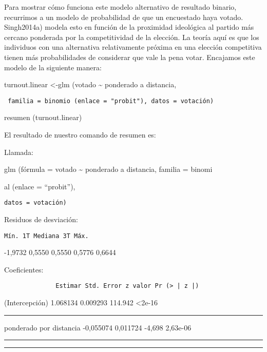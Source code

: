 \documentclass[
]{book}
\begin{document}
Para mostrar cómo funciona este modelo alternativo de resultado binario, recurrimos a un modelo de probabilidad de que un encuestado haya votado. Singh2014a) modela esto en función de la proximidad ideológica al partido más cercano ponderada por la competitividad de la elección. La teoría aquí es que los individuos con una alternativa relativamente próxima en una elección competitiva tienen más probabilidades de considerar que vale la pena votar. Encajamos este modelo de la siguiente manera:

turnout.linear \textless-glm (votado \textasciitilde{} ponderado a distancia,

\begin{verbatim}
 familia = binomio (enlace = "probit"), datos = votación)
\end{verbatim}

resumen (turnout.linear)

El resultado de nuestro comando de resumen es:

Llamada:

glm (fórmula = votado \textasciitilde{} ponderado a distancia, familia = binomi

al (enlace = ``probit''),

\begin{verbatim}
datos = votación)
\end{verbatim}

Residuos de desviación:

\begin{verbatim}
Mín. 1T Mediana 3T Máx.
\end{verbatim}

-1,9732 0,5550 0,5550 0,5776 0,6644

Coeficientes:

\begin{verbatim}
              Estimar Std. Error z valor Pr (> | z |)
\end{verbatim}

(Intercepción) 1.068134 0.009293 114.942 \textless2e-16

\begin{center}\rule{0.5\linewidth}{0.5pt}\end{center}

ponderado por distancia -0,055074 0,011724 -4,698 2,63e-06

\begin{center}\rule{0.5\linewidth}{0.5pt}\end{center}

\begin{center}\rule{0.5\linewidth}{0.5pt}\end{center}
\end{document}
